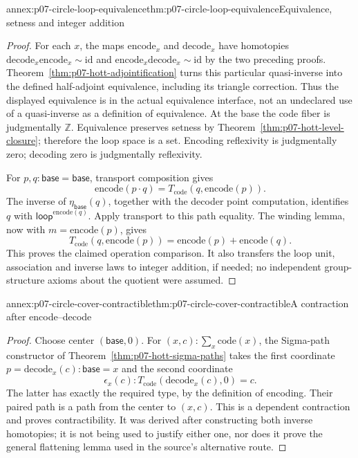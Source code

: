 \begin{annexitem}{annex:p07-circle-loop-equivalence}{thm:p07-circle-loop-equivalence}{Equivalence, setness and integer addition}
\begin{proof}
For each \(x\), the maps \(\mathrm{encode}_x\) and
\(\mathrm{decode}_x\) have homotopies
\(\mathrm{decode}_x\mathrm{encode}_x\sim\mathrm{id}\) and
\(\mathrm{encode}_x\mathrm{decode}_x\sim\mathrm{id}\)
by the two preceding proofs.
Theorem~\ref{thm:p07-hott-adjointification} turns this particular
quasi-inverse into the defined half-adjoint equivalence, including its
triangle correction. Thus the displayed equivalence is in the actual
equivalence interface, not an undeclared use of a quasi-inverse as a
definition of equivalence.
At the base the code fiber is judgmentally \(\mathbb Z\).
Equivalence preserves setness by
Theorem~\ref{thm:p07-hott-level-closure}; therefore the loop space
is a set. Encoding reflexivity is judgmentally zero; decoding zero
is judgmentally reflexivity.

For \(p,q:\mathsf{base}=\mathsf{base}\), transport composition gives
\[
\mathrm{encode}(p\cdot q)
 =T_{\mathrm{code}}(q,\mathrm{encode}(p)).
\]
The inverse of \(\eta_{\mathsf{base}}(q)\), together with the decoder
point computation, identifies \(q\) with
\(\mathsf{loop}^{\mathrm{encode}(q)}\).
Apply transport to this path equality. The winding lemma, now with
\(m=\mathrm{encode}(p)\), gives
\[
T_{\mathrm{code}}(q,\mathrm{encode}(p))
 =\mathrm{encode}(p)+\mathrm{encode}(q).
\]
This proves the claimed operation comparison. It also transfers the
loop unit, association and inverse laws to integer addition, if needed;
no independent group-structure axioms about the quotient were assumed.
\end{proof}
\end{annexitem}

\begin{annexitem}{annex:p07-circle-cover-contractible}{thm:p07-circle-cover-contractible}{A contraction after encode--decode}
\begin{proof}
Choose center \((\mathsf{base},0)\).
For \((x,c):\sum_x\mathrm{code}(x)\), the Sigma-path constructor of
Theorem~\ref{thm:p07-hott-sigma-paths} takes the first coordinate
\(p=\mathrm{decode}_x(c):\mathsf{base}=x\) and the second coordinate
\[
\epsilon_x(c):
T_{\mathrm{code}}(\mathrm{decode}_x(c),0)=c.
\]
The latter has exactly the required type, by the definition of encoding.
Their paired path is a path from the center to \((x,c)\).
This is a dependent contraction and proves contractibility.
It was derived after constructing both inverse homotopies; it is not
being used to justify either one, nor does it prove the general
flattening lemma used in the source's alternative route.
\end{proof}
\end{annexitem}

